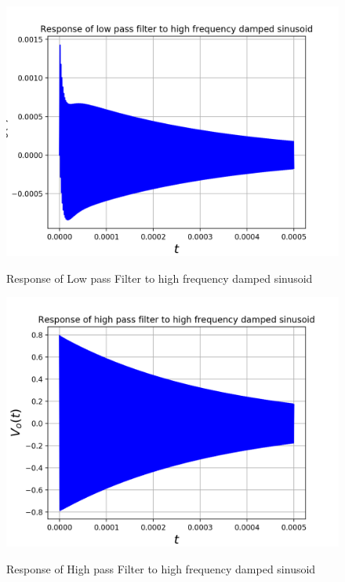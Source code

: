 \documentclass[11pt, a4paper]{article}
\begin{document}
\begin{figure}[H]
   	\centering
   	\includegraphics[scale=0.5]{lpf_high.png}
   	\label{fig:lpf_high}
   	\caption{Response of Low pass Filter to high frequency damped sinusoid}
\end{figure}
\begin{figure}[H]
   	\centering
   	\includegraphics[scale=0.5]{hpf_high.png}
   	\label{fig:hpf_high}
   	\caption{Response of High pass Filter to high frequency damped sinusoid}
\end{figure}
\end{document}
